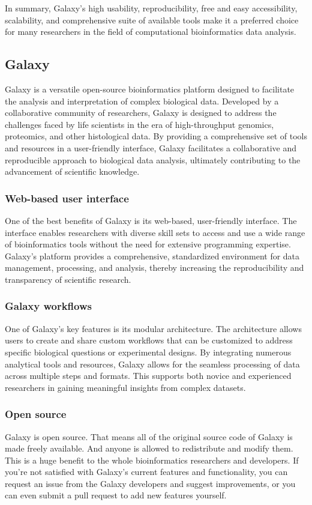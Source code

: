             In summary, Galaxy's high usability, reproducibility, free and easy accessibility, scalability, and comprehensive suite of available tools make it a preferred choice for many researchers in the field of computational bioinformatics data analysis.


    \subsection{Galaxy}
        Galaxy is a versatile open-source bioinformatics platform designed to facilitate the analysis and interpretation of complex biological data. Developed by a collaborative community of researchers, Galaxy is designed to address the challenges faced by life scientists in the era of high-throughput genomics, proteomics, and other histological data.
        By providing a comprehensive set of tools and resources in a user-friendly interface, Galaxy facilitates a collaborative and reproducible approach to biological data analysis, ultimately contributing to the advancement of scientific knowledge.
                
        \subsubsection{Web-based user interface}
        One of the best benefits of Galaxy is its web-based, user-friendly interface. The interface enables researchers with diverse skill sets to access and use a wide range of bioinformatics tools without the need for extensive programming expertise. Galaxy's platform provides a comprehensive, standardized environment for data management, processing, and analysis, thereby increasing the reproducibility and transparency of scientific research.

        \subsubsection{Galaxy workflows}
        One of Galaxy's key features is its modular architecture. The architecture allows users to create and share custom workflows that can be customized to address specific biological questions or experimental designs. By integrating numerous analytical tools and resources, Galaxy allows for the seamless processing of data across multiple steps and formats. This supports both novice and experienced researchers in gaining meaningful insights from complex datasets.

        \subsubsection{Open source}
        Galaxy is open source. That means all of the original source code of Galaxy is made freely available. And anyone is allowed to redistribute and modify them. This is a huge benefit to the whole bioinformatics researchers and developers. If you're not satisfied with Galaxy's current features and functionality, you can request an issue from the Galaxy developers and suggest improvements, or you can even submit a pull request to add new features yourself. 

